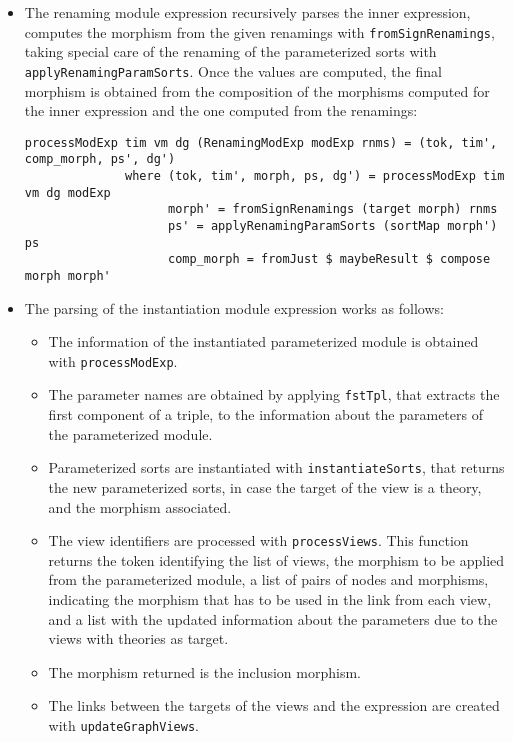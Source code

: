 \begin{itemize}
\item The renaming module expression recursively parses the inner expression, computes the morphism from the given renamings with \verb"fromSignRenamings",
taking special care of the renaming of the parameterized sorts with
\verb"applyRenamingParamSorts". Once the values are computed, the final morphism
is obtained from the composition of the morphisms computed for the inner
expression and the one computed from the renamings:


{\codesize
\begin{verbatim}
processModExp tim vm dg (RenamingModExp modExp rnms) = (tok, tim', comp_morph, ps', dg')
              where (tok, tim', morph, ps, dg') = processModExp tim vm dg modExp
                    morph' = fromSignRenamings (target morph) rnms
                    ps' = applyRenamingParamSorts (sortMap morph') ps
                    comp_morph = fromJust $ maybeResult $ compose morph morph'
\end{verbatim}
}

\item The parsing of the instantiation module expression works as follows:

\begin{itemize}
\item The information of the instantiated parameterized module is obtained
with \verb"processModExp".
\item The parameter names are obtained by applying \verb"fstTpl", that
extracts the first component of a triple, to the information about the
parameters of the parameterized module.
\item Parameterized sorts are instantiated with \verb"instantiateSorts",
that returns the new parameterized sorts, in case the target of the view
is a theory, and the morphism associated.
\item The view identifiers are processed with \verb"processViews". This
function returns the token identifying the list of views, the morphism
to be applied from the parameterized module, a list of pairs of nodes
and morphisms, indicating the morphism that has to be used in the link
from each view, and a list with the updated information about the
parameters due to the views with theories as target.
\item The morphism returned is the inclusion morphism.
\item The links between the targets of the views and the expression
are created with \verb"updateGraphViews". 
\end{itemize}


\end{itemize}

